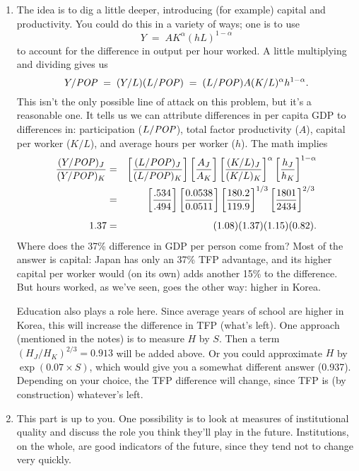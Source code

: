 \documentclass[letterpaper,12pt]{article}
\newcommand{\POP}{\mbox{\it POP\/}}
\begin{document}
\begin{enumerate}
\begin{enumerate}
\item The idea is to dig a little deeper, 
introducing (for example) capital and productivity.  
You could do this in a variety of ways; 
one is to use 
\[
    Y \;=\; A K^\alpha (h L)^{1-\alpha} 
\]
to account for the difference in output per hour worked.  
A little multiplying and dividing gives us 
\[
    Y/\POP \;=\; (Y/L) (L/\POP) 
            \;=\; (L/\POP) A (K/L)^\alpha h^{1-\alpha} .
\]
This isn't the only possible line of attack on this problem, but
it's a reasonable one.  It tells us we can attribute differences
in per capita GDP to differences in:  participation ($L/\POP$),
total factor productivity ($A$), capital per worker ($K/L$), 
and average hours per worker ($h$). 
The math implies
%
\begin{eqnarray*}
    \frac{(Y/\POP)_{J}}{(Y/\POP)_{K}} &=&
             \left[ \frac{(L/\POP)_J}{(L/\POP)_{K}} \right]
             \left[ \frac{A_J}{A_{K}} \right]
             \left[ \frac{(K/L)_{J}}{(K/L)_{K}} \right]^\alpha
             \left[ \frac{h_{J}}{h_{K}} \right]^{1-\alpha} \\
             &=& \left[ \frac{.534}{.494} \right]
                 \left[ \frac{0.0538}{0.0511} \right]
                 \left[ \frac{180.2}{119.9} \right]^{1/3}
                 \left[ \frac{1801}{2434} \right]^{2/3}_{\phantom{\sum_i}} \\
      1.37   &=& (1.08)(1.37) (1.15) (0.82) .
\end{eqnarray*}
%
Where does the 37\% difference in GDP per person come from?
Most of the answer is capital: 
Japan has only an 37\% TFP advantage, 
and its higher capital per worker would (on its own) 
adds another 15\% to the difference.  
But hours worked, as we've seen, goes the other way:  
higher in Korea.  

Education also plays a role here.  
Since average years of school are higher in Korea, this will increase the difference
in TFP (what's left).  
One approach (mentioned in the notes) is to measure $H$ by $S$.  
Then a term $(H_J/H_K)^{2/3} = 0.913 $ will be added above.  
Or you could approximate $H$ by $ \exp(0.07 \times S)$, which would give you a somewhat different answer (0.937).  
Depending on your choice, the TFP difference will change, 
since TFP is (by construction) whatever's left.  


\item This part is up to you.  
One possibility is to look at measures of institutional quality 
and discuss the role you think they'll play in the future.
Institutions, on the whole, are good indicators of the future, 
since they tend not to change very quickly.  
\end{enumerate}



\end{enumerate}
\end{document}
